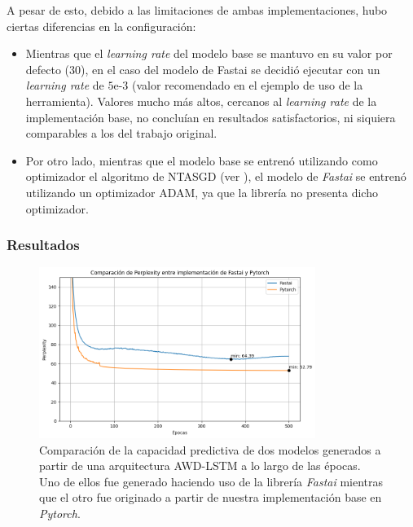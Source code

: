 A pesar de esto, debido a las limitaciones de ambas implementaciones, hubo ciertas 
diferencias en la configuración:

\begin{itemize}
    \item Mientras que el \textit{learning rate} del modelo base se mantuvo en su valor por defecto 
    ($30$), en el caso del modelo de Fastai se decidió ejecutar con un \textit{learning rate} 
    de $5\text{e-}3$ (valor recomendado en el ejemplo de uso de la herramienta). Valores mucho más 
    altos, cercanos al \textit{learning rate} de la implementación base, no concluían en resultados 
    satisfactorios, ni siquiera comparables a los del trabajo original.
    \item Por otro lado, mientras que el modelo base se entrenó utilizando como optimizador 
    el algoritmo de NTASGD (ver \textcite{merity2017regularizingoptimizinglstmlanguage}), el modelo de 
    \textit{Fastai} se entrenó utilizando un optimizador ADAM, ya que la librería no presenta 
    dicho optimizador.
\end{itemize}

\subsubsection{Resultados}

\begin{figure}[H]
    \centering
    \includegraphics[width=0.8\textwidth]{imagenes/validacion_modelo.png}
    \caption{Comparación de la capacidad predictiva de dos modelos generados a partir 
    de una arquitectura AWD-LSTM a lo largo de las épocas. Uno de ellos fue generado 
    haciendo uso de la librería \textit{Fastai} mientras que el otro fue originado a partir 
    de nuestra implementación base en \textit{Pytorch}.}
    \label{fig:validacion_modelo}
\end{figure}

